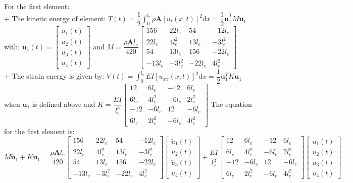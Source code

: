 \documentclass[14pt,a4paper]{article}
\begin{document}
\begin{enumerate}
	For the first element:\\
	+ The kinetic energy of element: $T(t) = \dfrac{1}{2}\int_{0}^{l_e} \rho \textbf{A}[u_t(x,t)]^2\mathrm{d}x = \dfrac{1}{2}\dot{\textbf{u}}_1^TM\dot{\textbf{u}}_1$ \\
	with: $\textbf{u}_1(t) = \begin{bmatrix} u_1(t) \\ u_2(t) \\ u_3(t) \\ u_4(t) \end{bmatrix}$ \hspace{1cm} and \hspace{1cm} $ M = \dfrac{\rho \textbf{A}l_e}{420} \begin{bmatrix} 156 & 22l_e & 54 & -12l_e \\ 22l_e & 4l_e^2 & 13l_e & -3l_e^2 \\ 54 & 13l_e & 156 & -22l_e \\ -13l_e & -3l_e^2 & -22l_e & 4l_e^2 \end{bmatrix} $\\
	+ The strain energy is given by: $V(t) = \int_{0}^{l_e} EI[u_{xx}(x,t)]^2\mathrm{d}x = \dfrac{1}{2}\textbf{u}_1^TK\textbf{u}_1$\\
	when $\textbf{u}_1$ is defined above and $K = \dfrac{EI}{l_e^3} \begin{bmatrix} 12 & 6l_e & -12 & 6l_e \\ 6l_e & 4l_e^2 & -6l_e & 2l_e^2 \\ -12 & -6l_e & 12 & -6l_e \\ 6l_e & 2l_e^2 & -6l_e & 4l_e^2 \end{bmatrix} $
	The equation for the first element is:\\
	$M\ddot{\textbf{u}}_1 + K\textbf{u}_1 = \dfrac{\rho \textbf{A}l_e}{420} \begin{bmatrix} 156 & 22l_e & 54 & -12l_e \\ 22l_e & 4l_e^2 & 13l_e & -3l_e^2 \\ 54 & 13l_e & 156 & -22l_e \\ -13l_e & -3l_e^2 & -22l_e & 4l_e^2 \end{bmatrix} \begin{bmatrix} \ddot{u}_1(t) \\ \ddot{u}_2(t) \\ \ddot{u}_3(t) \\ \ddot{u}_4(t) \end{bmatrix} + \dfrac{EI}{l_e^3} \begin{bmatrix} 12 & 6l_e & -12 & 6l_e \\ 6l_e & 4l_e^2 & -6l_e & 2l_e^2 \\ -12 & -6l_e & 12 & -6l_e \\ 6l_e & 2l_e^2 & -6l_e & 4l_e^2 \end{bmatrix} \begin{bmatrix} u_1(t) \\ u_2(t) \\ u_3(t) \\ u_4(t) \end{bmatrix} =$\\

\end{enumerate}
\end{document}
